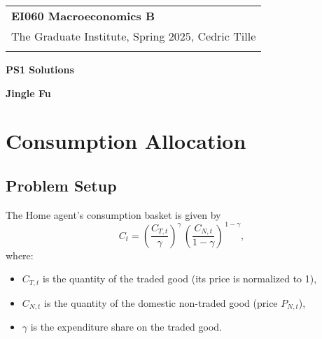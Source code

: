 \documentclass[a4paper,12pt]{article} %
\theoremstyle{nonitalic}
\begin{document}
\thispagestyle{empty} %

\begin{tabular}{p{15.5cm}} %
{\large \bf EI060 Macroeconomics B} \\
The Graduate Institute, Spring 2025, Cedric Tille\\
\hline %
\\
\end{tabular} %

\vspace*{0.3cm} %

\begin{center} %
	{\Large \bf PS1 Solutions} %
	\vspace{2mm}
	
	{\bf Jingle Fu} %
		
\end{center}  

\vspace{0.4cm}

\section{Consumption Allocation}

\subsection*{Problem Setup}
The Home agent's consumption basket is given by
\[
C_t = \left(\frac{C_{T,t}}{\gamma } \right)^{\gamma}\,\left(\frac{C_{N,t}}{1 - \gamma} \right)^{\,1-\gamma},
\]
where:
\begin{itemize}
    \item $C_{T,t}$ is the quantity of the traded good (its price is normalized to 1),
    \item $C_{N,t}$ is the quantity of the domestic non-traded good (price $P_{N,t}$),
    \item $\gamma$ is the expenditure share on the traded good.
\end{itemize}
\end{document}
